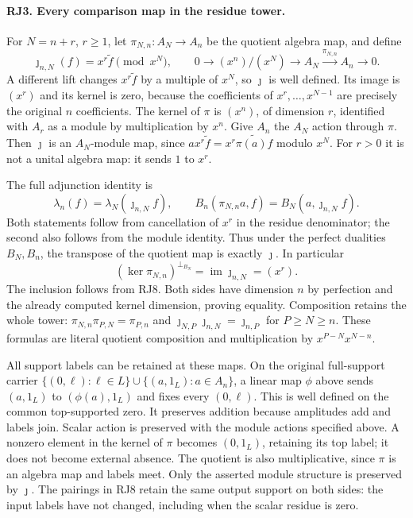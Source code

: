\documentclass[11pt,a4paper]{article}
\theoremstyle{definition}\newtheorem{definition}[theorem]{Definition}
\begin{document}
\paragraph{RJ3. Every comparison map in the residue tower.}
For $N=n+r$, $r\ge1$, let $\pi_{N,n}:A_N\to A_n$ be the quotient
algebra map, and define
\[
 \jmath_{n,N}(f)=x^r\widetilde f\pmod{x^N},
 \qquad
 0\longrightarrow (x^n)/(x^N)\longrightarrow A_N
       \xrightarrow{\pi_{N,n}}A_n\longrightarrow0.
 \tag{RJ7}
\]
A different lift changes $x^r\widetilde f$ by a multiple of $x^N$,
so $\jmath$ is well defined. Its image is $(x^r)$ and its kernel is
zero, because the coefficients of $x^r,\ldots,x^{N-1}$ are precisely
the original $n$ coefficients. The kernel of $\pi$ is $(x^n)$,
of dimension $r$, identified with $A_r$ as a module by multiplication
by $x^n$. Give $A_n$ the $A_N$ action through $\pi$. Then
$\jmath$ is an $A_N$-module map, since
$a x^r\widetilde f=x^r\widetilde{\pi(a)f}$ modulo $x^N$.
For $r>0$ it is not a unital algebra map: it sends $1$ to $x^r$.

The full adjunction identity is
\[
 \boxed{\lambda_n(f)=\lambda_N(\jmath_{n,N}f),\qquad
 B_n(\pi_{N,n}a,f)=B_N(a,\jmath_{n,N}f).}
 \tag{RJ8}
\]
Both statements follow from cancellation of $x^r$ in the residue
denominator; the second also follows from the module identity. Thus
under the perfect dualities $B_N,B_n$, the transpose of the quotient
map is exactly $\jmath$. In particular
\[
 (\ker\pi_{N,n})^{\perp_{B_N}}=\operatorname{im}\jmath_{n,N}=(x^r).
 \tag{RJ9}
\]
The inclusion follows from RJ8. Both sides have dimension $n$ by
perfection and the already computed kernel dimension, proving equality.
Composition retains the whole tower:
$\pi_{N,n}\pi_{P,N}=\pi_{P,n}$ and
$\jmath_{N,P}\jmath_{n,N}=\jmath_{n,P}$ for $P\ge N\ge n$.
These formulas are literal quotient composition and multiplication
by $x^{P-N}x^{N-n}$.

All support labels can be retained at these maps. On the original
full-support carrier $\{(0,\ell):\ell\in L\}\cup
\{(a,1_L):a\in A_n\}$, a linear map $\phi$ above sends
$(a,1_L)$ to $(\phi(a),1_L)$ and fixes every $(0,\ell)$.
This is well defined on the common top-supported zero. It preserves
addition because amplitudes add and labels join. Scalar action is
preserved with the module actions specified above. A nonzero element
in the kernel of $\pi$ becomes $(0,1_L)$, retaining its top label;
it does not become external absence. The quotient is also
multiplicative, since $\pi$ is an algebra map and labels meet.
Only the asserted module structure is preserved by $\jmath$.
The pairings in RJ8 retain the same output support on both sides:
the input labels have not changed, including when the scalar residue
is zero.
\end{document}
